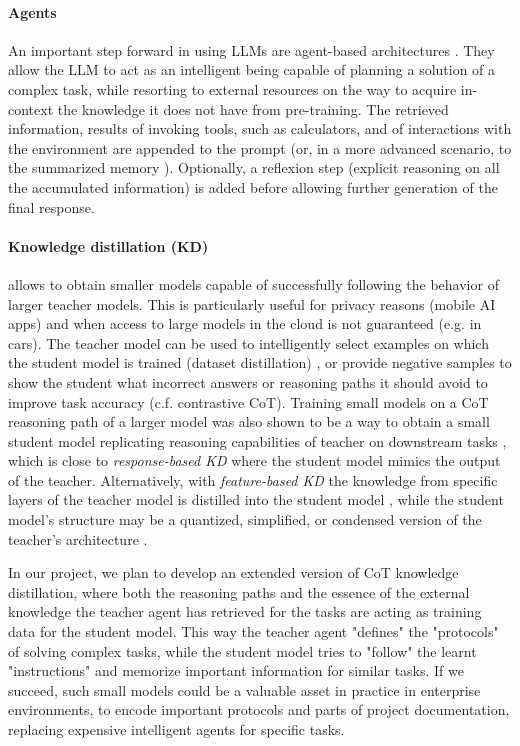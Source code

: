 \documentclass{article}
\begin{document}
\paragraph{Agents} An important step forward in using LLMs are agent-based architectures \cite{lin2024swiftsage} \cite{ghafarollahi2024sciagents}. They allow the LLM to act as an intelligent being capable of planning a solution of a complex task, while resorting to external resources on the way to acquire in-context the knowledge it does not have from pre-training. The retrieved information, results of invoking tools, such as calculators, and of interactions with the environment are appended to the prompt (or, in a more advanced scenario, to the summarized memory \cite{ge2023context}). Optionally, a reflexion step (explicit reasoning on all the accumulated information) is added before allowing further generation of the final response. 

\paragraph{Knowledge distillation (KD)} allows to obtain smaller models capable of successfully following the behavior of larger teacher models. This is particularly useful for privacy reasons (mobile AI apps) and when access to large models in the cloud is not guaranteed (e.g. in cars). The teacher model can be used to intelligently select examples on which the student model is trained (dataset distillation) \cite{yu2023dataset}, or provide negative samples to show the student what incorrect answers or reasoning paths it should avoid to improve task accuracy \cite{li2024turning} (c.f. contrastive CoT). Training small models on a CoT reasoning path of a larger model was also shown to be a way to obtain a small student model replicating reasoning capabilities of teacher on downstream tasks \cite{magister2022teaching}, which is close to \textit{response-based KD} where the student model mimics the output of the teacher. Alternatively, with \textit{feature-based KD} the knowledge from specific layers of the teacher model is distilled into the student model \cite{sepahvand2022teacher}, while the student model's structure may be a quantized, simplified, or condensed version of the teacher's architecture \cite{gou2021knowledge}. 

In our project, we plan to develop an extended version of CoT knowledge distillation, where both the reasoning paths and the essence of the external knowledge the teacher agent has retrieved for the tasks are acting as training data for the student model. This way the teacher agent "defines" the "protocols" of solving complex tasks, while the student model tries to "follow" the learnt "instructions" and memorize important information for similar tasks. If we succeed, such small models could be a valuable asset in practice in enterprise environments, to encode important protocols and parts of project documentation, replacing expensive intelligent agents for specific tasks. 
\end{document}
